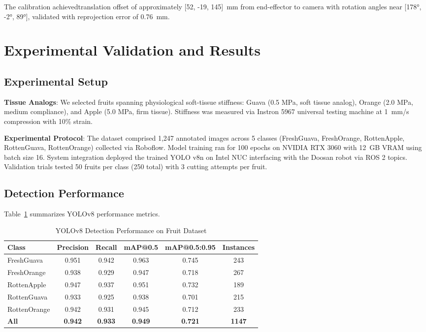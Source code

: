 \documentclass[journal]{IEEEtran}
\begin{document}
The calibration achievedtranslation offset of approximately [52, -19, 145]~mm from end-effector to camera with rotation angles near [178°, -2°, 89°], validated with reprojection error of 0.76~mm.

\section{Experimental Validation and Results}

\subsection{Experimental Setup}

\textbf{Tissue Analogs}: We selected fruits spanning physiological soft-tissue stiffness: Guava (0.5 MPa, soft tissue analog), Orange (2.0 MPa, medium compliance), and Apple (5.0 MPa, firm tissue). Stiffness was measured via Instron 5967 universal testing machine at 1~mm/s compression with 10\% strain.

\textbf{Experimental Protocol}: The dataset comprised 1,247 annotated images across 5 classes (FreshGuava, FreshOrange, RottenApple, RottenGuava, RottenOrange) collected via Roboflow. Model training ran for 100 epochs on NVIDIA RTX 3060 with 12~GB VRAM using batch size 16. System integration deployed the trained YOLO v8n on Intel NUC interfacing with the Doosan robot via ROS 2 topics. Validation trials tested 50 fruits per class (250 total) with 3 cutting attempts per fruit.

\subsection{Detection Performance}

Table~\ref{tab:detection_results} summarizes YOLOv8 performance metrics.

\begin{table}[t]
\caption{YOLOv8 Detection Performance on Fruit Dataset}
\label{tab:detection_results}
\centering
\begin{tabular}{lccccc}
\hline
Class & Precision & Recall & mAP@0.5 & mAP@0.5:0.95 & Instances \\
\hline
FreshGuava & 0.951 & 0.942 & 0.963 & 0.745 & 243 \\
FreshOrange & 0.938 & 0.929 & 0.947 & 0.718 & 267 \\
RottenApple & 0.947 & 0.937 & 0.951 & 0.732 & 189 \\
RottenGuava & 0.933 & 0.925 & 0.938 & 0.701 & 215 \\
RottenOrange & 0.942 & 0.931 & 0.945 & 0.712 & 233 \\
\hline
\textbf{All} & \textbf{0.942} & \textbf{0.933} & \textbf{0.949} & \textbf{0.721} & \textbf{1147} \\
\hline
\end{tabular}
\end{table}
\end{document}
